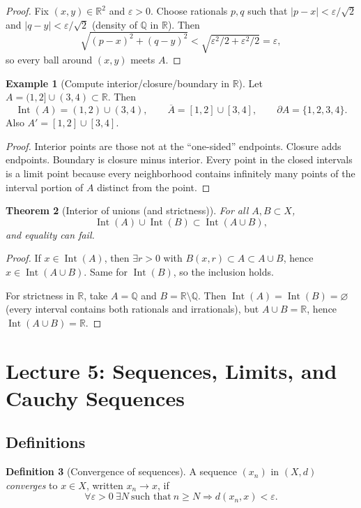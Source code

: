 \documentclass[11pt]{article}
\newtheorem{theorem}{Theorem}[section]
\theoremstyle{definition}
\newtheorem{definition}[theorem]{Definition}
\newtheorem{example}[theorem]{Example}
\newcommand{\R}{\mathbb{R}}
\newcommand{\Q}{\mathbb{Q}}
\newcommand{\eps}{\varepsilon}
\newcommand{\ol}[1]{\overline{#1}}
\newcommand{\Int}{\operatorname{Int}}
\newcommand{\Bd}{\partial}
\begin{document}
\begin{proof}
Fix $(x,y)\in\R^2$ and $\eps>0$. Choose rationals $p,q$ such that
$|p-x|<\eps/\sqrt2$ and $|q-y|<\eps/\sqrt2$ (density of $\Q$ in $\R$).
Then
\[
\sqrt{(p-x)^2+(q-y)^2}<\sqrt{\eps^2/2+\eps^2/2}=\eps,
\]
so every ball around $(x,y)$ meets $A$.
\end{proof}

\begin{example}[Compute interior/closure/boundary in $\R$]
Let $A=(1,2]\cup(3,4)\subset\R$.
Then
\[
\Int(A)=(1,2)\cup(3,4),\qquad \ol A=[1,2]\cup[3,4],\qquad \Bd A=\{1,2,3,4\}.
\]
Also $A'=[1,2]\cup[3,4]$.
\end{example}

\begin{proof}
Interior points are those not at the ``one-sided'' endpoints. Closure adds endpoints.
Boundary is closure minus interior. Every point in the closed intervals is a limit point because every neighborhood contains infinitely many points of the interval portion of $A$ distinct from the point.
\end{proof}

\begin{theorem}[Interior of unions (and strictness)]
For all $A,B\subset X$,
\[
\Int(A)\cup \Int(B)\subset \Int(A\cup B),
\]
and equality can fail.
\end{theorem}

\begin{proof}
If $x\in\Int(A)$, then $\exists r>0$ with $B(x,r)\subset A\subset A\cup B$, hence $x\in\Int(A\cup B)$.
Same for $\Int(B)$, so the inclusion holds.

For strictness in $\R$, take $A=\Q$ and $B=\R\setminus\Q$.
Then $\Int(A)=\Int(B)=\varnothing$ (every interval contains both rationals and irrationals), but $A\cup B=\R$, hence $\Int(A\cup B)=\R$.
\end{proof}

\section{Lecture 5: Sequences, Limits, and Cauchy Sequences}

\subsection{Definitions}

\begin{definition}[Convergence of sequences]
A sequence $(x_n)$ in $(X,d)$ \emph{converges} to $x\in X$, written $x_n\to x$, if
\[
\forall \eps>0\ \exists N\ \text{such that}\ n\ge N\Rightarrow d(x_n,x)<\eps.
\]
\end{definition}
\end{document}

